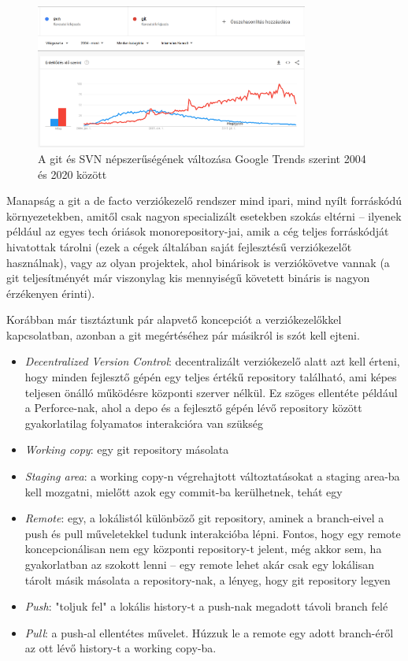 \begin{figure}[H]
    \centering
    \includegraphics[width=0.8\textwidth]{images/gitsvn.png}
    \caption{A git és SVN népszerűségének változása Google Trends szerint 2004 és 2020 között}
    \label{fig:git-svn-trends}
\end{figure}


Manapság a git a de facto verziókezelő rendszer mind ipari, mind nyílt forráskódú környezetekben, amitől csak nagyon specializált esetekben szokás eltérni -- ilyenek például az egyes tech óriások monorepository-jai, amik a cég teljes forráskódját hivatottak tárolni (ezek a cégek általában saját fejlesztésű verziókezelőt használnak), vagy az olyan projektek, ahol binárisok is verziókövetve vannak (a git teljesítményét már viszonylag kis mennyiségű követett bináris is nagyon érzékenyen érinti).

Korábban már tisztáztunk pár alapvető koncepciót a verziókezelőkkel kapcsolatban, azonban a git megértéséhez pár másikról is szót kell ejteni.

\begin{itemize}
    \item \textit{Decentralized Version Control}: decentralizált verziókezelő alatt azt kell érteni, hogy minden fejlesztő gépén egy teljes értékű repository található, ami képes teljesen önálló működésre központi szerver nélkül. Ez szöges ellentéte például a Perforce-nak, ahol a depo és a fejlesztő gépén lévő repository között gyakorlatilag folyamatos interakcióra van szükség
    \item \textit{Working copy}: egy git repository másolata
    \item \textit{Staging area}: a working copy-n végrehajtott változtatásokat a staging area-ba kell mozgatni, mielőtt azok egy commit-ba kerülhetnek, tehát egy
    \item \textit{Remote}: egy, a lokálistól különböző git repository, aminek a branch-eivel a push és pull műveletekkel tudunk interakcióba lépni. Fontos, hogy egy remote koncepcionálisan nem egy központi repository-t jelent, még akkor sem, ha gyakorlatban az szokott lenni -- egy remote lehet akár csak egy lokálisan tárolt másik másolata a repository-nak, a lényeg, hogy git repository legyen
    \item \textit{Push}: "toljuk fel" a lokális history-t a push-nak megadott távoli branch felé
    \item \textit{Pull}: a push-al ellentétes művelet. Húzzuk le a remote egy adott branch-éről az ott lévő history-t a working copy-ba.
\end{itemize}

